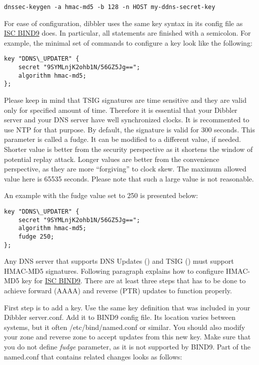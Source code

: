 \begin{lstlisting}
dnssec-keygen -a hmac-md5 -b 128 -n HOST my-ddns-secret-key
\end{lstlisting}

For ease of configuration, dibbler uses the same key syntax in its
config file as \href{http://www.isc.org/software/bind}{ISC BIND9}
does. In particular, all statements are finished with a semicolon. For
example, the minimal set of commands to configure a key look like the
following:

\begin{lstlisting}
key "DDNS\_UPDATER" {
    secret "9SYMLnjK2ohb1N/56GZ5Jg==";
    algorithm hmac-md5;
};
\end{lstlisting}

Please keep in mind that TSIG signatures are time sensitive and they
are valid only for specified amount of time. Therefore it is essential
that your Dibbler server and your DNS server have well synchronized
clocks. It is recommented to use NTP for that purpose. By default, the
signature is valid for 300 seconds. This parameter is called a
fudge. It can be modified to a different value, if needed. Shorter
value is better from the security perspective as it shortens the
window of potential replay attack. Longer values are better from the
convenience perspective, as they are more ``forgiving'' to clock
skew. The maximum allowed value here is 65535 seconds. Please note
that such a large value is not reasonable.

An example with the fudge value set to 250 is presented below:

\begin{lstlisting}
key "DDNS\_UPDATER" {
    secret "9SYMLnjK2ohb1N/56GZ5Jg==";
    algorithm hmac-md5;
    fudge 250;
};
\end{lstlisting}

Any DNS server that supports DNS Updates (\cite{rfc2136}) and TSIG
(\cite{rfc2845}) must support HMAC-MD5 signatures. Following paragraph
explains how to configure HMAC-MD5 key
for \href{http://www.isc.org/software/bind}{ISC BIND9}. There are at
least three steps that has to be done to achieve forward (AAAA) and
reverse (PTR) updates to function properly.

First step is to add a key. Use the same key definition that was included in your
Dibbler server.conf. Add it to BIND9 config file. Its location varies
between systems, but it often /etc/bind/named.conf or similar. You should also
modify your zone and reverse zone to accept updates from this new
key. Make sure that you do not define \emph{fudge} parameter, as it is
not supported by BIND9. Part of the named.conf that contains related
changes looks as follows:

